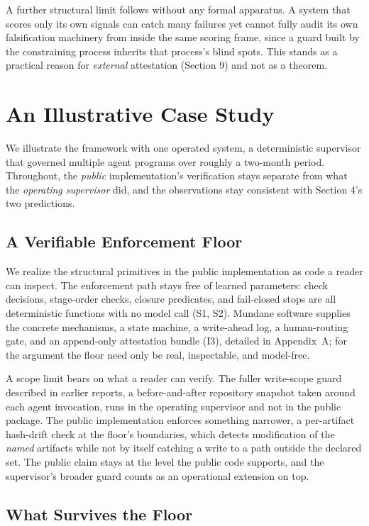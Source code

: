 \documentclass[11pt]{article}
\begin{document}
A further structural limit follows without any formal apparatus. A system that scores only its own signals can catch many failures yet cannot fully audit its own falsification machinery from inside the same scoring frame, since a guard built by the constraining process inherits that process's blind spots. This stands as a practical reason for \emph{external} attestation (Section 9) and not as a theorem.

\section{An Illustrative Case Study}

We illustrate the framework with one operated system, a deterministic supervisor that governed multiple agent programs over roughly a two-month period. Throughout, the \emph{public} implementation's verification stays separate from what the \emph{operating supervisor} did, and the observations stay consistent with Section 4's two predictions.

\subsection{A Verifiable Enforcement Floor}

We realize the structural primitives in the public implementation as code a reader can inspect. The enforcement path stays free of learned parameters: check decisions, stage-order checks, closure predicates, and fail-closed stops are all deterministic functions with no model call (S1, S2). Mundane software supplies the concrete mechanisms, a state machine, a write-ahead log, a human-routing gate, and an append-only attestation bundle (I3), detailed in Appendix~A; for the argument the floor need only be real, inspectable, and model-free.

A scope limit bears on what a reader can verify. The fuller write-scope guard described in earlier reports, a before-and-after repository snapshot taken around each agent invocation, runs in the operating supervisor and not in the public package. The public implementation enforces something narrower, a per-artifact hash-drift check at the floor's boundaries, which detects modification of the \emph{named} artifacts while not by itself catching a write to a path outside the declared set. The public claim stays at the level the public code supports, and the supervisor's broader guard counts as an operational extension on top.

\subsection{What Survives the Floor}
\end{document}
